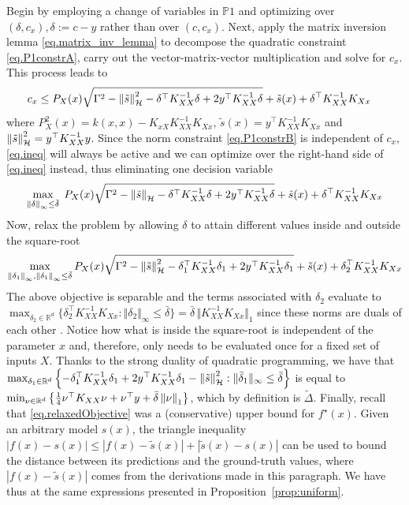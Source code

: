 Begin by employing a change of variables in $\mathds{P}1$ and optimizing over $(\delta, c_x), \delta := c - y$ rather than over $(c , c_x)$. Next, apply the matrix inversion lemma \eqref{eq.matrix_inv_lemma} to decompose the quadratic constraint \eqref{eq.P1constrA}, carry out the vector-matrix-vector multiplication and solve for $c_x$. This process leads to
\begin{equation}
	\begin{aligned}
		c_x  \leq \;&  P_X(x) \sqrt{ \Gamma^2 - \left\| \tilde s \right\|_\mathcal{H}^2 - \delta^\top K_{XX}^{-1}\delta +2y^\top K_{XX}^{-1}\delta} +\tilde s(x) 
		+ \delta^\top K_{XX}^{-1}K_{Xx}
	\end{aligned}	
	\label{eq.ineq}
\end{equation}
where $P_X^2(x) = k(x,x) - K_{xX} K_{XX}^{-1} K_{Xx}$, $\tilde{s}(x) = y^\top K_{XX}^{-1} K_{Xx}$ and $\left\| \tilde s \right\|_\mathcal{H}^2 = y^\top K_{XX}^{-1} y$. Since the norm constraint \eqref{eq.P1constrB} is independent of $c_x$, \eqref{eq.ineq} will always be active and we can optimize over the right-hand side of \eqref{eq.ineq} instead, thus eliminating one decision variable
\begin{equation}
	\max_{\left\| \delta \right\|_\infty \leq \bar \delta}\; P_X(x) \sqrt{ \Gamma^2 - \left\| \tilde s \right\|_\mathcal{H} - \delta^\top K_{XX}^{-1}\delta +2y^\top K_{XX}^{-1}\delta} + \tilde s(x) + \delta^\top K_{XX}^{-1}K_{Xx} 
\end{equation}
Now, relax the problem by allowing $\delta$ to attain different values inside and outside the square-root
	\begin{equation}
		\max_{\left\| \delta_1 \right\|_\infty,\left\| \delta_1 \right\|_\infty \leq \bar\delta} P_X(x) \sqrt{ \Gamma^2 - \left\| \tilde s \right\|_\mathcal{H}^2 - \delta_1^\top K_{XX}^{-1}\delta_1 +2y^\top K_{XX}^{-1}\delta_1} + \tilde s(x) + \delta_2^\top K_{XX}^{-1}K_{Xx}  \label{eq.relaxedObjective}
	\end{equation}
The above objective is separable and the terms associated with $\delta_2$ evaluate to $\max_{\delta_2 \in \mathbb{R}^d} \{ \delta_2^\top K_{XX}^{-1}K_{Xx} : \Vert \delta_2 \Vert_\infty \leq \bar\delta \} = \bar{\delta} \, \Vert K_{XX}^{-1}K_{Xx} \Vert_1$ since these norms are duals of each other \citep[§A.1.6]{boyd2004convex}. Notice how what is inside the square-root is independent of the parameter $x$ and, therefore, only needs to be evaluated once for a fixed set of inputs $X$. Thanks to the strong duality of quadratic programming, we have that $\max_{\delta_1 \in \mathbb{R}^d} \left\{ -\delta_1^\top K_{XX}^{-1}\delta_1 + 2y^\top K_{XX}^{-1}\delta_1 - \left\| \tilde s \right\|_\mathcal{H}^2 : \Vert \bar\delta_1 \Vert_\infty \leq \bar\delta \right\}$  is equal to $\min_{\nu \in \mathbb{R}^d} \left\{ \frac{1}{4}\nu^\top K_{XX}\nu + \nu^\top y + \bar{\delta} \left\| \nu \right\|_1\right\}$, which by definition is $\tilde \Delta$.
Finally, recall that \eqref{eq.relaxedObjective} was a (conservative) upper bound for $f^\star(x)$. Given an arbitrary model $s(x)$, the triangle inequality $|f(x) - s(x)| \leq |f(x) - \tilde s(x)| + |\tilde s(x) - s(x)|$ can be used to bound the distance between its predictions and the ground-truth values, where $|f(x) - \tilde s(x)|$ comes from the derivations made in this paragraph. We have thus at the same expressions presented in Proposition~\ref{prop:uniform}.

